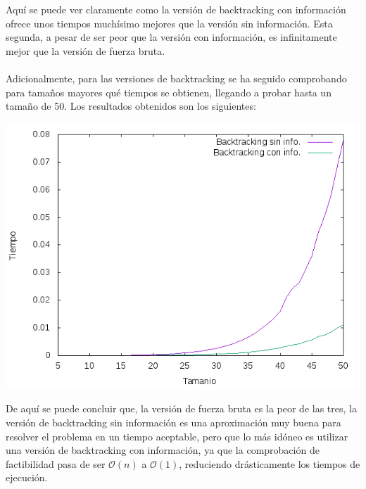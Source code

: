 \documentclass{article}
\begin{document}
  Aquí se puede ver claramente como la versión de backtracking con información ofrece unos tiempos muchísimo mejores que la versión sin información. Esta segunda, a pesar de ser peor que la versión con información, es infinitamente mejor que la versión de fuerza bruta.\\\\
  Adicionalmente, para las versiones de backtracking se ha seguido comprobando para tamaños mayores qué tiempos se obtienen, llegando a probar hasta un tamaño de 50. Los resultados obtenidos son los siguientes:
  \begin{center}
  \includegraphics[scale=0.70]{screenshots/comparacion_back_50.png}
  \end{center}
  De aquí se puede concluir que, la versión de fuerza bruta es la peor de las tres, la versión de backtracking sin información es una aproximación muy buena para resolver el problema en un tiempo aceptable, pero que lo más idóneo es utilizar una versión de backtracking con información, ya que la comprobación de factibilidad pasa de ser $\mathcal{O}(n)$ a $\mathcal{O}(1)$, reduciendo drásticamente los tiempos de ejecución.
  
\end{document}
